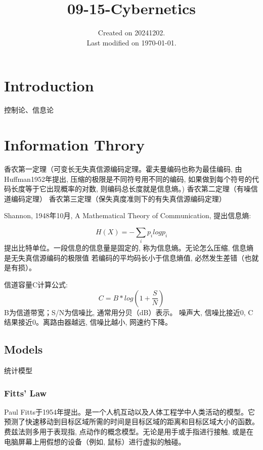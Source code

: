 \documentclass[UTF8]{../09-Mathematics}
\begin{document}
\title{09-15-Cybernetics}
\date{Created on 20241202.\\   Last modified on \today.}
\maketitle
\tableofcontents


\chapter{Introduction}



控制论、信息论



\chapter{Information Throry}



香农第一定理（可变长无失真信源编码定理。霍夫曼编码也称为最佳编码, 由Huffman1952年提出, 压缩的极限是不同符号用不同的编码, 如果做到每个符号的代码长度等于它出现概率的对数, 则编码总长度就是信息熵。)
香农第二定理（有噪信道编码定理）
香农第三定理（保失真度准则下的有失真信源编码定理）

Shannon, 1948年10月, A Mathematical Theory of Communication, 提出信息熵: 

\begin{equation}
    H(X) = - \sum_i p_i logp_i
\end{equation}
提出比特单位。一段信息的信息量是固定的, 称为信息熵。无论怎么压缩, 信息熵是无失真信源编码的极限值
若编码的平均码长小于信息熵值, 必然发生差错（也就是有损）。


信道容量C计算公式: 
\begin{equation}
    C = B * log(1+ \frac{S}{N})
\end{equation}
B为信道带宽；S/N为信噪比, 通常用分贝（dB）表示。
噪声大, 信噪比接近0, C结果接近0。离路由器越远, 信噪比越小, 网速约下降。


\section{Models}
统计模型
\subsection{Fitts' Law}
Paul Fitts于1954年提出。是一个人机互动以及人体工程学中人类活动的模型。它预测了快速移动到目标区域所需的时间是目标区域的距离和目标区域大小的函数。费兹法则多用于表现指, 点动作的概念模型。无论是用手或手指进行接触, 或是在电脑屏幕上用假想的设备（例如, 鼠标）进行虚拟的触碰。
\end{document}
